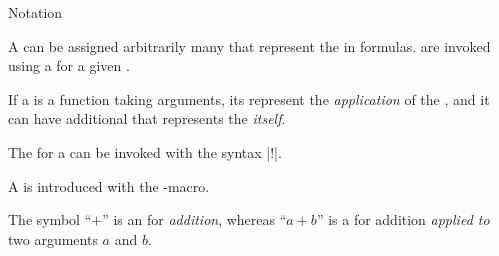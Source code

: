 \documentclass{stex}
\begin{document}
  \begin{smodule}[title=Notations]{Notation}

    \begin{sparagraph}[style={defibox,symdoc},name=notation]
        A  can be assigned arbitrarily many 
         that represent the
         in formulas.  are invoked
        using a  for a given .

        If a  is a function taking arguments,
        its  represent the \emph{application}
        of the , and
        it can have additional 
        that represents the  \emph{itself}.

        The  for a 
         can be invoked with the syntax
        |!|.

         A 
        is introduced with the -macro.
    \end{sparagraph}

    \begin{sexample}[for={notation,operator notation}]
        The symbol ``$+$'' is an  for 
        \emph{addition}, whereas ``$a + b$'' is a 
        for addition \emph{applied to} two arguments $a$ and $b$.
    \end{sexample}
    
  \end{smodule}
\end{document}
